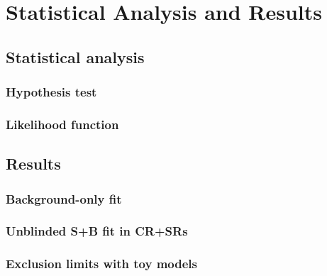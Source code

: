 \chapter{Statistical Analysis and Results}
\label{chapter:results}

\section{Statistical analysis}
\subsection{Hypothesis test}
\subsection{Likelihood function}


\section{Results}
\subsection{Background-only fit}
\subsection{Unblinded S+B fit in CR+SRs}
\subsection{Exclusion limits with toy models}